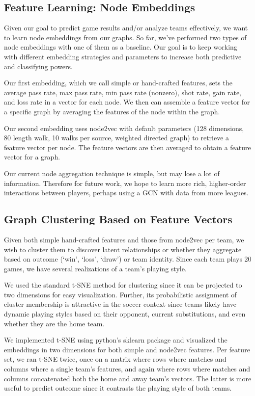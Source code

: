 \subsection{Feature Learning: Node Embeddings}
Given our goal to predict game results and/or analyze teams effectively, we want to learn node embeddings from our graphs. So far, we've performed two types of node embeddings with one of them as a baseline. Our goal is to keep working with different embedding strategies and parameters to increase both predictive and classifying powers. 

Our first embedding, which we call simple or hand-crafted features, sets the average pass rate, max pass rate, min pass rate (nonzero), shot rate, gain rate, and loss rate in a vector for each node. We then can assemble a feature vector for a specific graph by averaging the features of the node within the graph. 

Our second embedding uses node2vec with default parameters (128 dimensions, 80 length walk, 10 walks per source, weighted directed graph) to retrieve a feature vector per node. The feature vectors are then averaged to obtain a feature vector for a graph. 

Our current node aggregation technique is simple, but may lose a lot of information. Therefore for future work, we hope to learn more rich, higher-order interactions between players, perhaps using a GCN with data from more leagues.

\subsection{Graph Clustering Based on Feature Vectors}
Given both simple hand-crafted features and those from node2vec per team, we wish to cluster them to discover latent relationships or whether they aggregate based on outcome (`win', `loss', `draw') or team identity. Since each team plays 20 games, we have several realizations of a team's playing style.

We used the standard t-SNE method for clustering since it can be projected to two dimensions for easy visualization. Further, its probabilistic assignment of cluster membership is attractive in the soccer context since teams likely have dynamic playing styles based on their opponent, current substitutions, and even whether they are the home team.

We implemented t-SNE using python's  sklearn package and visualized the embeddings in two dimensions for both simple and node2vec features. Per feature set, we ran t-SNE twice, once on a matrix where rows where matches and columns where a single team's features, and again where rows where matches and columns concatenated both the home and away team's vectors. The latter is more useful to predict outcome since it contrasts the playing style of both teams.

